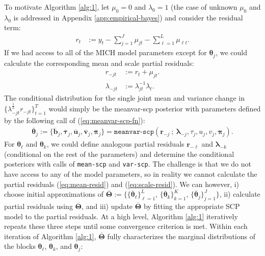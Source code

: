 

To motivate Algorithm \ref{alg:1}, let $\mu_0 = 0$ and $\lambda_0 = 1$ (the case of unknown $\mu_0$ and $\lambda_0$ is addressed in Appendix \ref{app:empirical-bayes}) and consider the residual term:
\begin{align}\label{eq:residual}
    r_t &:= y_t - \sum_{j = 1}^J \mu_{jt}  - \sum_{\ell = 1}^L \mu_{\ell t}.
\end{align}
If we had access to all of the MICH model parameters except for $\boldsymbol{\theta}_j$, we could calculate the corresponding mean and scale partial residuals: 
\begin{align}
    r_{-j t} &:= r_t + \mu_{j t}. \label{eq:mean-resid} \\
    \lambda_{-jt} &:= \lambda_{jt}^{-1}\lambda_t. \label{eq:scale-resid}
\end{align}
The conditional distribution for the single joint mean and variance change in $\{\lambda_{-jt}^\frac{1}{2}r_{-j t}\}_{t=1}^T$ would simply be the meanvar-scp posterior with parameters defined by the following call of (\ref{eq:meanvar-scp-fn}):
\begin{align}
    \overline{\boldsymbol{\theta}}_j := \{\overline{\mathbf{b}}_{j}, \overline{\boldsymbol{\tau}}_{j}, \overline{\mathbf{u}}_{j}, \overline{\mathbf{v}}_{j}, \overline{\boldsymbol{\pi}}_{j}\} = \texttt{meanvar-scp}(\mathbf{r}_{-j}\:;\: \boldsymbol{\lambda}_{-j}, \tau_j, u_j, v_j, \boldsymbol{\pi}_{j}).
\end{align}
For $\boldsymbol{\theta}_\ell$ and $\boldsymbol{\theta}_k$, we could define analogous partial residuals $\mathbf{r}_{-\ell}$ and $\boldsymbol{\lambda}_{-k}$ (conditional on the rest of the parameters) and determine the conditional posteriors with calls of \texttt{mean-scp} and \texttt{var-scp}. The challenge is that we do not have access to any of the model parameters, so  in reality we cannot calculate the partial residuals (\ref{eq:mean-resid}) and (\ref{eq:scale-resid}). We can however, i) choose initial approximations of $\overline{\boldsymbol{\Theta}} := \{\{\overline{\boldsymbol{\theta}}_\ell\}_{\ell=1}^L$, $\{\overline{\boldsymbol{\theta}}_k\}_{k=1}^K$, $\{\overline{\boldsymbol{\theta}}_j\}_{j=1}^J\}$, ii) calculate partial residuals using $\overline{\boldsymbol{\Theta}}$, and iii) update $\overline{\boldsymbol{\Theta}} $ by fitting the appropriate SCP model to the partial residuals. At a high level, Algorithm \ref{alg:1} iteratively repeats these three steps until some convergence criterion is met. Within each iteration of Algorithm \ref{alg:1}, $\overline{\boldsymbol{\Theta}} $ fully characterizes the marginal distributions of the blocks $\boldsymbol{\theta}_\ell$, $\boldsymbol{\theta}_k$, and $\boldsymbol{\theta}_j$:
